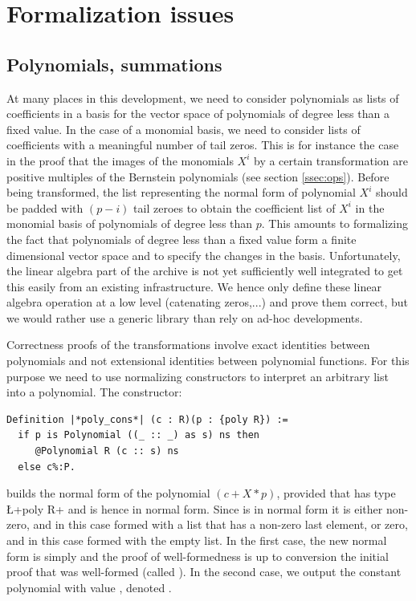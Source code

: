 \documentclass{mscs}
\begin{document}
\section{Formalization issues}
\label{sec:formal}

\subsection{Polynomials, summations}

At many places in this development, we need to consider polynomials as
lists of
coefficients in a basis for the vector space of polynomials of degree
less than a fixed value. In the case of a monomial basis, we need to
consider lists of coefficients with a meaningful number of tail
zeros. This is for instance the case in the proof that the images of
the monomials \(X^i\) by a certain transformation are positive
multiples of the Bernstein polynomials (see section \ref{ssec:ops}).
Before being transformed, the list representing the normal form of
polynomial \(X^i\) should be padded with $(p - i)$ tail zeroes to
obtain the coefficient list of \(X^i\) in the monomial basis of
polynomials of degree less than $p$. This
amounts to formalizing the fact that polynomials of degree less than a
fixed value form a finite dimensional vector space and to specify the
changes in the basis. Unfortunately, the linear algebra part of the
\ssr{} archive is not yet sufficiently well integrated to get this
easily from an existing infrastructure. We hence only define these
linear algebra operation at a low level (catenating zeros,...) and
prove them correct, but we would rather use a generic library than
rely on ad-hoc developments.

Correctness proofs  of the transformations involve exact identities
between polynomials and not extensional identities between polynomial
functions. For this purpose we need to use normalizing constructors to
interpret an arbitrary list into a polynomial. The constructor:

\begin{lstlisting}
Definition |*poly_cons*| (c : R)(p : {poly R}) :=
  if p is Polynomial ((_ :: _) as s) ns then
     @Polynomial R (c :: s) ns
  else c%:P.
\end{lstlisting}
builds the normal form of the polynomial $(c + X*p)$, provided that
 has type \L+{poly R}+ and is hence in normal form. Since 
is in normal form it is either non-zero, and in this case formed with
a list  that has a non-zero last element, or zero, and in this case formed
with the empty list. In the first case, the new normal form is simply
 and the proof of well-formedness is up to conversion the
initial proof that  was well-formed (called ). In the second case, we
output the constant polynomial with value , denoted .
\end{document}
